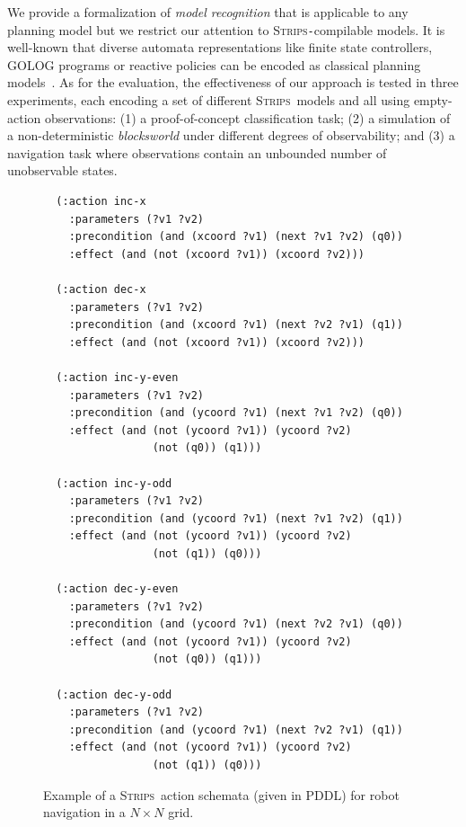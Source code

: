 \documentclass[letterpaper]{article} %
\newcommand{\strips}{\textsc{Strips}}     %
\begin{document}
We provide a formalization of {\em model recognition} that is applicable to any planning model but we restrict our attention to \strips\texttt{-}compilable models. It is well-known that diverse automata representations like finite state controllers, {\sc GOLOG} programs or reactive policies can be encoded as classical planning models~\cite{BaierFM07,Geffner:FSM:AAAI10,segovia2017generating}. As for the evaluation, the effectiveness of our approach is tested in three experiments, each encoding a set of different \strips\ models and all using empty-action observations: (1) a proof-of-concept classification task; (2) a simulation of a non-deterministic \emph{blocksworld} under different degrees of observability; and (3) a navigation task where observations contain an unbounded number of unobservable states.







\begin{figure}
  \begin{tiny}
  \begin{verbatim}
  (:action inc-x
    :parameters (?v1 ?v2)
    :precondition (and (xcoord ?v1) (next ?v1 ?v2) (q0))
    :effect (and (not (xcoord ?v1)) (xcoord ?v2)))

  (:action dec-x
    :parameters (?v1 ?v2)
    :precondition (and (xcoord ?v1) (next ?v2 ?v1) (q1))
    :effect (and (not (xcoord ?v1)) (xcoord ?v2)))

  (:action inc-y-even
    :parameters (?v1 ?v2)
    :precondition (and (ycoord ?v1) (next ?v1 ?v2) (q0))
    :effect (and (not (ycoord ?v1)) (ycoord ?v2)
                 (not (q0)) (q1)))

  (:action inc-y-odd
    :parameters (?v1 ?v2)
    :precondition (and (ycoord ?v1) (next ?v1 ?v2) (q1))
    :effect (and (not (ycoord ?v1)) (ycoord ?v2)
                 (not (q1)) (q0)))

  (:action dec-y-even
    :parameters (?v1 ?v2)
    :precondition (and (ycoord ?v1) (next ?v2 ?v1) (q0))
    :effect (and (not (ycoord ?v1)) (ycoord ?v2)
                 (not (q0)) (q1)))

  (:action dec-y-odd
    :parameters (?v1 ?v2)
    :precondition (and (ycoord ?v1) (next ?v2 ?v1) (q1))
    :effect (and (not (ycoord ?v1)) (ycoord ?v2)
                 (not (q1)) (q0)))
  \end{verbatim}
  \end{tiny}
 \caption{\small Example of a \strips\ action schemata (given in PDDL) for robot navigation in a $N\times N$ grid.}
\label{fig:model-example}
\end{figure}
\end{document}
